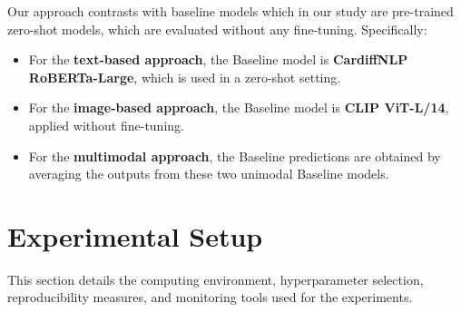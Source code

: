 \begin{table}[ht]
    \centering
    \caption{Architectural Variations}
    \label{tab:architectural_variations}
\end{table}

Our approach contrasts with baseline models which in our study are pre-trained zero-shot models, which are evaluated without any fine-tuning. Specifically:

\begin{itemize}
    \item For the \textbf{text-based approach}, the Baseline model is \textbf{CardiffNLP RoBERTa-Large}, which is used in a zero-shot setting.
    \item For the \textbf{image-based approach}, the Baseline model is \textbf{CLIP ViT-L/14}, applied without fine-tuning.
    \item For the \textbf{multimodal approach}, the Baseline predictions are obtained by averaging the outputs from these two unimodal Baseline models.
\end{itemize}


\section{Experimental Setup}
\label{sec:Experimental Setup}
This section details the computing environment, hyperparameter selection, reproducibility measures, and monitoring tools used for the experiments.

